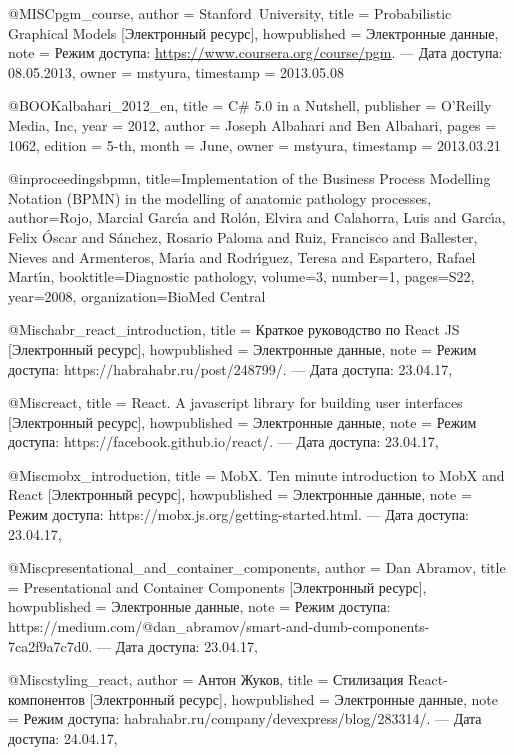 
@MISC{pgm_course,
  author = {\mbox{Stanford University}},
  title = {Probabilistic Graphical Models [Электронный ресурс]},
  howpublished = {Электронные данные},
  note = {Режим доступа: \url{https://www.coursera.org/course/pgm}. --- Дата
	доступа: 08.05.2013},
  owner = {mstyura},
  timestamp = {2013.05.08}
}

@BOOK{albahari_2012_en,
  title = {C\# 5.0 in a Nutshell},
  publisher = {O’Reilly Media, Inc},
  year = {2012},
  author = {Joseph Albahari and Ben Albahari},
  pages = {1062},
  edition = {5-th},
  month = {June},
  owner = {mstyura},
  timestamp = {2013.03.21}
}

@inproceedings{bpmn,
  title={Implementation of the Business Process Modelling Notation (BPMN) in the modelling of anatomic pathology processes},
  author={Rojo, Marcial Garc{\'\i}a and Rol{\'o}n, Elvira and Calahorra, Luis and Garc{\'\i}a, Felix {\'O}scar and S{\'a}nchez, Rosario Paloma and Ruiz, Francisco and Ballester, Nieves and Armenteros, Mar{\'\i}a and Rodr{\'\i}guez, Teresa and Espartero, Rafael Mart{\'\i}n},
  booktitle={Diagnostic pathology},
  volume={3},
  number={1},
  pages={S22},
  year={2008},
  organization={BioMed Central}
}

@Misc{habr_react_introduction,
  title        = {Краткое руководство по React JS [Электронный ресурс]},
  howpublished = {Электронные данные},
  note         = {Режим доступа: https://habrahabr.ru/post/248799/. --- Дата доступа: 23.04.17},
}

@Misc{react,
  title        = {React. A javascript library for building user interfaces [Электронный ресурс]},
  howpublished = {Электронные данные},
  note         = {Режим доступа: https://facebook.github.io/react/. --- Дата доступа: 23.04.17},
}

@Misc{mobx_introduction,
  title        = {MobX. Ten minute introduction to MobX and React [Электронный ресурс]},
  howpublished = {Электронные данные},
  note         = {Режим доступа: https://mobx.js.org/getting-started.html. --- Дата доступа: 23.04.17},
}

@Misc{presentational_and_container_components,
  author       = {Dan Abramov},
  title        = {Presentational and Container Components [Электронный ресурс]},
  howpublished = {Электронные данные},
  note         = {Режим доступа: https://medium.com/$@$dan\_abramov/smart-and-dumb-components-7ca2f9a7c7d0. --- Дата доступа: 23.04.17},
}

@Misc{styling_react,
  author       = {Антон Жуков},
  title        = {Стилизация React-компонентов [Электронный ресурс]},
  howpublished = {Электронные данные},
  note         = {Режим доступа: habrahabr.ru/company/devexpress/blog/283314/. --- Дата доступа: 24.04.17},
}

